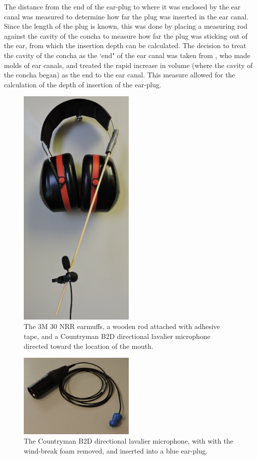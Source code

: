 The distance from the end of the ear-plug to where it was enclosed by the ear canal was measured to determine how far the plug was inserted in the ear canal.
Since the length of the plug is known, this was done by placing a measuring rod against the cavity of the concha to measure how far the plug was sticking out of the ear, from which the insertion depth can be calculated. The decision to treat the cavity of the concha as the `end" of the ear canal was taken from \cite{stenfelt:07}, who made molds of ear canals, and treated the rapid increase in volume (where the cavity of the concha began) as the end to the ear canal.  This measure allowed for the calculation of the depth of insertion of the ear-plug.

\begin{figure}
\includegraphics[width=0.5\textwidth]{figure/earmuffSetup.JPG}
\caption{The 3M 30 NRR earmuffs, a wooden rod attached with adhesive tape, and a Countryman B2D directional lavalier microphone directed toward the location of the mouth.}
\label{fig:micInsertPlug}
\end{figure}

\begin{figure}
\includegraphics[width=0.5\textwidth]{figure/micInsertPlug.JPG}
\caption{The Countryman B2D directional lavalier microphone, with with the wind-break foam removed, and inserted into a blue ear-plug.}
\label{fig:earmuffSetup}
\end{figure}


